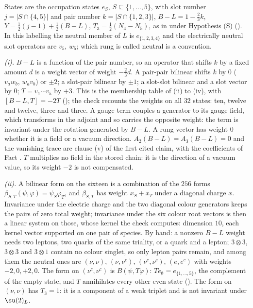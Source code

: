 States are the occupation states $e_{S}$, $S \subseteq \{1, \dots, 5\}$, with slot number $j = |S \cap \{4, 5\}|$ and pair number $k = |S \cap \{1, 2, 3\}|$, $B - L = 1 - \tfrac23k$, $Y = \tfrac12(j - 1) + \tfrac12(B - L)$, $T_{3} = \tfrac12(N_{4} - N_{5})$, as in  under Hypothesis (S) (). In this labelling the neutral member of $L$ is $e_{\{1,2,3,4\}}$ and the electrically neutral slot operators are $v_{5}$, $w_{5}$; which rung is called neutral is a convention.

\emph{(i).} $B - L$ is a function of the pair number, so an operator that shifts $k$ by a fixed amount $d$ is a weight vector of weight $-\tfrac23d$. A pair-pair bilinear shifts $k$ by $0$ ($v_{a}w_{b}$, $w_{a}v_{b}$) or $\pm2$; a slot-pair bilinear by $\pm1$; a slot-slot bilinear and a slot vector by $0$; $T = v_{1}\cdots v_{5}$ by $+3$. This is the membership table of (ii) to (iv), with $[B - L, T] = -2T$ (); the check recounts the weights on all $32$ states: ten, twelve and twelve, three and three. A gauge term couples a generator to its gauge field, which transforms in the adjoint and so carries the opposite weight: the term is invariant under the rotation generated by $B - L$. A rung vector has weight $0$ whether it is a field or a vacuum direction. $A_{2}(B - L) = A_{3}(B - L) = 0$ and the vanishing trace are clause (v) of the first cited claim, with the coefficients of Fact . $T$ multiplies no field in the stored chain: it is the direction of a vacuum value, so its weight $-2$ is not compensated.

\emph{(ii).} A bilinear form on the sixteen is a combination of the $256$ forms $\beta_{S,T}(\psi, \varphi) = \psi_{S}\varphi_{T}$, and $\beta_{S,T}$ has weight $x_{S} + x_{T}$ under a diagonal charge $x$. Invariance under the electric charge and the two diagonal colour generators keeps the pairs of zero total weight; invariance under the six colour root vectors is then a linear system on those, whose kernel the check computes: dimension $10$, each kernel vector supported on one pair of species. By hand: a nonzero $B - L$ weight needs two leptons, two quarks of the same triality, or a quark and a lepton; $3 \otimes 3$, $\bar{3} \otimes \bar{3}$ and $3 \otimes 1$ contain no colour singlet, so only lepton pairs remain, and among them the neutral ones are $(\nu, \nu)$, $(\nu, \nu^{c})$, $(\nu^{c}, \nu^{c})$, $(e, e^{c})$ with weights $-2, 0, +2, 0$. The form on $(\nu^{c}, \nu^{c})$ is $B(\psi, T\varphi)$: $Te_{\emptyset} = e_{\{1,\dots,5\}}$, the complement of the empty state, and $T$ annihilates every other even state (). The form on $(\nu, \nu)$ has $T_{3} = 1$: it is a component of a weak triplet and is not invariant under $\su(2)_{L}$.

